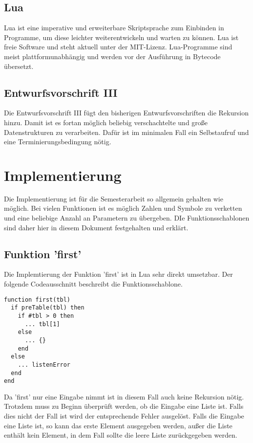 \section{Lua}
Lua ist eine imperative und erweiterbare Skriptsprache zum Einbinden in Programme, um diese leichter weiterentwickeln und warten zu können. Lua ist freie Software und steht aktuell unter der MIT-Lizenz. Lua-Programme sind meist plattformunabhängig und werden vor der Ausführung in Bytecode übersetzt. 


\section{Entwurfsvorschrift III}
Die Entwurfsvorschrift III fügt den bisherigen Entwurfsvorschriften die Rekursion hinzu. Damit ist es fortan möglich beliebig verschachtelte und große Datenstrukturen zu verarbeiten. Dafür ist im minimalen Fall ein Selbstaufruf und eine Terminierungsbedingung nötig.

\chapter{Implementierung}
Die Implementierung ist für die Semesterarbeit so allgemein gehalten wie möglich. Bei vielen Funktionen ist es möglich Zahlen und Symbole zu verketten und eine beliebige Anzahl an Parametern zu übergeben. DIe Funktionsschablonen sind daher hier in diesem Dokument festgehalten und erklärt.

\section{Funktion 'first'}
Die Implemtierung der Funktion 'first' ist in Lua sehr direkt umsetzbar. Der folgende Codeausschnitt beschreibt die Funktionsschablone.
\begin{lstlisting}
function first(tbl)
  if preTable(tbl) then
    if #tbl > 0 then
      ... tbl[1]
    else
      ... {}
    end
  else
    ... listenError
  end
end
\end{lstlisting}

Da 'first' nur eine Eingabe nimmt ist in diesem Fall auch keine Rekursion nötig. Trotzdem muss zu Beginn überprüft werden, ob die Eingabe eine Liste ist. Falls dies nicht der Fall ist wird der entsprechende Fehler ausgelöst. Falls die Eingabe eine Liste ist, so kann das erste Element ausgegeben werden, außer die Liste enthält kein Element, in dem Fall sollte die leere Liste zurückgegeben werden.

